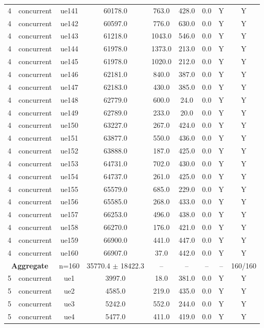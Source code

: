 \begin{table}[ht]
\begin{tabular}{|c|c|c|c|c|c|c|c|c|}
4 & concurrent & ue141 & 60178.0 & 763.0 & 428.0 & 0.0 & Y & Y \\
4 & concurrent & ue142 & 60597.0 & 776.0 & 630.0 & 0.0 & Y & Y \\
4 & concurrent & ue143 & 61218.0 & 1043.0 & 546.0 & 0.0 & Y & Y \\
4 & concurrent & ue144 & 61978.0 & 1373.0 & 213.0 & 0.0 & Y & Y \\
4 & concurrent & ue145 & 61978.0 & 1020.0 & 212.0 & 0.0 & Y & Y \\
4 & concurrent & ue146 & 62181.0 & 840.0 & 387.0 & 0.0 & Y & Y \\
4 & concurrent & ue147 & 62183.0 & 430.0 & 385.0 & 0.0 & Y & Y \\
4 & concurrent & ue148 & 62779.0 & 600.0 & 24.0 & 0.0 & Y & Y \\
4 & concurrent & ue149 & 62789.0 & 233.0 & 20.0 & 0.0 & Y & Y \\
4 & concurrent & ue150 & 63227.0 & 267.0 & 424.0 & 0.0 & Y & Y \\
4 & concurrent & ue151 & 63877.0 & 550.0 & 436.0 & 0.0 & Y & Y \\
4 & concurrent & ue152 & 63888.0 & 187.0 & 425.0 & 0.0 & Y & Y \\
4 & concurrent & ue153 & 64731.0 & 702.0 & 430.0 & 0.0 & Y & Y \\
4 & concurrent & ue154 & 64737.0 & 261.0 & 425.0 & 0.0 & Y & Y \\
4 & concurrent & ue155 & 65579.0 & 685.0 & 229.0 & 0.0 & Y & Y \\
4 & concurrent & ue156 & 65585.0 & 268.0 & 433.0 & 0.0 & Y & Y \\
4 & concurrent & ue157 & 66253.0 & 496.0 & 438.0 & 0.0 & Y & Y \\
4 & concurrent & ue158 & 66270.0 & 176.0 & 421.0 & 0.0 & Y & Y \\
4 & concurrent & ue159 & 66900.0 & 441.0 & 447.0 & 0.0 & Y & Y \\
4 & concurrent & ue160 & 66907.0 & 37.0 & 442.0 & 0.0 & Y & Y \\
\multicolumn{2}{|c|}{\textbf{Aggregate}} & n=160 & 35770.4 $\pm$ 18422.3 & -- & -- & -- & -- & 160/160 \\
\hline
5 & concurrent & ue1 & 3997.0 & 18.0 & 381.0 & 0.0 & Y & Y \\
5 & concurrent & ue2 & 4585.0 & 219.0 & 435.0 & 0.0 & Y & Y \\
5 & concurrent & ue3 & 5242.0 & 552.0 & 244.0 & 0.0 & Y & Y \\
5 & concurrent & ue4 & 5477.0 & 411.0 & 419.0 & 0.0 & Y & Y \\

\end{tabular}
\end{table}
